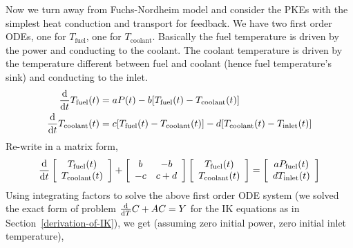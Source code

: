 \documentclass{school-22.211-notes}
\begin{document}
\clearpage
{}
Now we turn away from Fuchs-Nordheim model and consider the PKEs with the simplest heat conduction and transport for feedback. We have two first order ODEs, one for $T_{\mathrm{fuel}}$, one for $T_{\mathrm{coolant}}$. Basically the fuel temperature is driven by the power and conducting to the coolant. The coolant temperature is driven by the temperature different between fuel and coolant (hence fuel temperature's sink) and conducting to the inlet. 
\begin{align}
\frac{\mathrm{d}}{\mathrm{d}t} T_{\mathrm{fuel}} (t) &= a P(t) - b [T_{\mathrm{fuel}}(t) - T_{\mathrm{coolant}}(t)] \\
\frac{\mathrm{d}}{\mathrm{d}t} T_{\mathrm{coolant}} (t) &= c [T_{\mathrm{fuel}}(t) - T_{\mathrm{coolant}} (t) ] - d [T_{\mathrm{coolant}} (t) - T_{\mathrm{inlet}} (t) ] 
\end{align}
Re-write in a matrix form, 
\begin{align}
\frac{\mathrm{d}}{\mathrm{d}t} \left[ \begin{array}{c} T_{\mathrm{fuel}}(t) \\ T_{\mathrm{coolant}} (t) \end{array} \right]
+ \left[ \begin{array}{cc} b & -b \\ -c & c+d \end{array} \right] 
\left[ \begin{array}{c} T_{\mathrm{fuel}} (t) \\ T_{\mathrm{coolant}} (t) \end{array} \right] 
= 
\left[ \begin{array}{c} a P_{\mathrm{fuel}}(t) \\ d T_{\mathrm{inlet}}(t) \end{array} \right]
\end{align}
Using integrating factors to solve the above first order ODE system (we solved the exact form of problem $\frac{\mathrm{d}}{\mathrm{d}T} C + A C = Y$ for the IK equations as in Section~\ref{derivation-of-IK}),  we get (assuming zero initial power, zero initial inlet temperature), 
\end{document}
